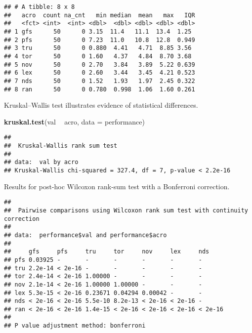 \documentclass[]{book}
\newenvironment{Shaded}{\begin{snugshade}}{\end{snugshade}}
\newcommand{\DataTypeTok}[1]{\textcolor[rgb]{0.13,0.29,0.53}{#1}}
\newcommand{\KeywordTok}[1]{\textcolor[rgb]{0.13,0.29,0.53}{\textbf{#1}}}
\newcommand{\NormalTok}[1]{#1}
\newcommand{\OperatorTok}[1]{\textcolor[rgb]{0.81,0.36,0.00}{\textbf{#1}}}
\newcommand{\OtherTok}[1]{\textcolor[rgb]{0.56,0.35,0.01}{#1}}
\newcommand{\StringTok}[1]{\textcolor[rgb]{0.31,0.60,0.02}{#1}}
\begin{document}
\begin{verbatim}
## # A tibble: 8 x 8
##   acro  count na_cnt   min median  mean   max   IQR
##   <fct> <int>  <int> <dbl>  <dbl> <dbl> <dbl> <dbl>
## 1 gfs      50      0 3.15  11.4   11.1  13.4  1.25 
## 2 pfs      50      0 7.23  11.0   10.8  12.8  0.949
## 3 tru      50      0 0.880  4.41   4.71  8.85 3.56 
## 4 tor      50      0 1.60   4.37   4.84  8.70 3.68 
## 5 nov      50      0 2.70   3.84   3.89  5.22 0.639
## 6 lex      50      0 2.60   3.44   3.45  4.21 0.523
## 7 nds      50      0 1.52   1.93   1.97  2.45 0.322
## 8 ran      50      0 0.780  0.998  1.06  1.60 0.261
\end{verbatim}

Kruskal--Wallis test illustrates evidence of statistical differences.

\begin{Shaded}
\begin{Highlighting}[]
\KeywordTok{kruskal.test}\NormalTok{(val }\OperatorTok{~}\StringTok{ }\NormalTok{acro, }\DataTypeTok{data =}\NormalTok{ performance)}
\end{Highlighting}
\end{Shaded}

\begin{verbatim}
## 
##  Kruskal-Wallis rank sum test
## 
## data:  val by acro
## Kruskal-Wallis chi-squared = 327.4, df = 7, p-value < 2.2e-16
\end{verbatim}

Results for post-hoc Wilcoxon rank-sum test with a Bonferroni correction.

\begin{Shaded}
\end{Shaded}

\begin{verbatim}
## 
##  Pairwise comparisons using Wilcoxon rank sum test with continuity correction 
## 
## data:  performance$val and performance$acro 
## 
##     gfs     pfs     tru     tor     nov     lex     nds    
## pfs 0.03925 -       -       -       -       -       -      
## tru 2.2e-14 < 2e-16 -       -       -       -       -      
## tor 2.4e-14 < 2e-16 1.00000 -       -       -       -      
## nov 2.1e-14 < 2e-16 1.00000 1.00000 -       -       -      
## lex 5.3e-15 < 2e-16 0.23671 0.04294 0.00042 -       -      
## nds < 2e-16 < 2e-16 5.5e-10 8.2e-13 < 2e-16 < 2e-16 -      
## ran < 2e-16 < 2e-16 1.4e-15 < 2e-16 < 2e-16 < 2e-16 < 2e-16
## 
## P value adjustment method: bonferroni
\end{verbatim}
\end{document}
